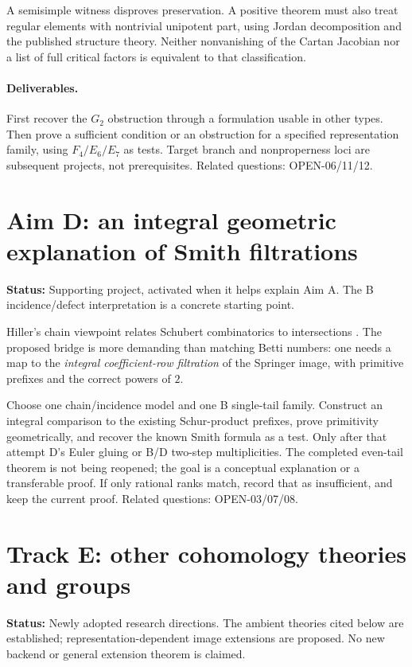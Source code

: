\documentclass[11pt,letterpaper]{article}
\newcommand{\status}[1]{\noindent\textbf{Status:} #1\par}
\begin{document}
A semisimple witness disproves preservation. A positive theorem must also
treat regular elements with nontrivial unipotent part, using Jordan
decomposition and the published structure theory. Neither nonvanishing of
the Cartan Jacobian nor a list of full critical factors is equivalent to
that classification.

\paragraph{Deliverables.}
First recover the \(G_2\) obstruction through a formulation usable in other
types. Then prove a sufficient condition or an obstruction for a specified
representation family, using \(F_4/E_6/E_7\) as tests. Target branch and
nonproperness loci are subsequent projects, not prerequisites.
Related questions: OPEN-06/11/12.

\section{Aim D: an integral geometric explanation of Smith filtrations}
\status{Supporting project, activated when it helps explain Aim A.
The B incidence/defect interpretation is a concrete starting point.}

Hiller's chain viewpoint relates Schubert combinatorics to intersections
\cite{H}. The proposed bridge is more demanding than matching Betti numbers:
one needs a map to the \emph{integral coefficient-row filtration} of the
Springer image, with primitive prefixes and the correct powers of \(2\).

Choose one chain/incidence model and one B single-tail family. Construct
an integral comparison to the existing Schur-product prefixes, prove
primitivity geometrically, and recover the known Smith formula as a test.
Only after that attempt D's Euler gluing or B/D two-step multiplicities.
The completed even-tail theorem is not being reopened; the goal is a
conceptual explanation or a transferable proof. If only rational ranks
match, record that as insufficient, and keep the current proof.
Related questions: OPEN-03/07/08.

\newpage
\section{Track E: other cohomology theories and groups}
\status{Newly adopted research directions. The ambient theories cited below
are established; representation-dependent image extensions are proposed.
No new backend or general extension theorem is claimed.}
\end{document}

